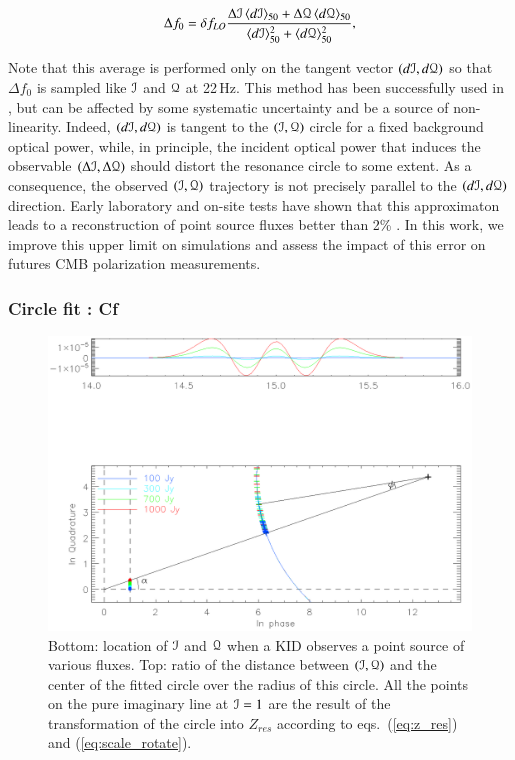 \begin{equation}
\label{eq:Rf}
\Delta f_{0} = \delta f_{LO} \frac{\Delta \mathcal{I}\, \langle d\mathcal{I}
  \rangle_{50}
+ \Delta \mathcal{Q}\, \langle d\mathcal{Q} \rangle_{50}}{\langle d\mathcal{I}
  \rangle_{50}^{2}
 + \langle d\mathcal{Q} \rangle_{50}^{2}},
\end{equation}

Note that this average is performed only on the tangent vector $(d\mathcal{I},d\mathcal{Q})$ so
that $\Delta f_0$ is sampled like $\mathcal{I}$ and $\mathcal{Q}$ at 22\,Hz. This method has been
successfully used in , but can be affected by some systematic
uncertainty and be a source of non-linearity. Indeed, $(d\mathcal{I},d\mathcal{Q})$ is tangent to
the $(\mathcal{I},\mathcal{Q})$ circle for a fixed background optical power, while, in principle,
the incident optical power that induces the observable $(\Delta \mathcal{I}, \Delta \mathcal{Q})$
should distort the resonance circle to some extent. As a consequence, the
observed $(\mathcal{I},\mathcal{Q})$ trajectory is not precisely parallel to the $(d\mathcal{I},d\mathcal{Q})$
direction. Early laboratory and on-site tests have shown that this approximaton
leads to a reconstruction of point source fluxes better than 2\%
\citep{2013A&A...551L..12C}. In this work, we improve this upper limit on
simulations and assess the impact of this error on futures CMB polarization
measurements.

\subsubsection{Circle fit : Cf}

\begin{figure}
\includegraphics[clip, angle=0, width=\columnwidth]{Figures/circle_zres.eps}
\caption{Bottom: location of $\mathcal{I}$ and $\mathcal{Q}$ when a KID observes a point source of
  various fluxes. Top: ratio of the distance between $(\mathcal{I},\mathcal{Q})$ and the center of
  the fitted circle over the radius of this circle. All the points on the pure
  imaginary line at $\mathcal{I}=1$ are the result of the transformation of the circle
  into $Z_{res}$ according to eqs.~(\ref{eq:z_res}) and
  (\ref{eq:scale_rotate}).}
\label{fig:circle_zres}
\end{figure}

